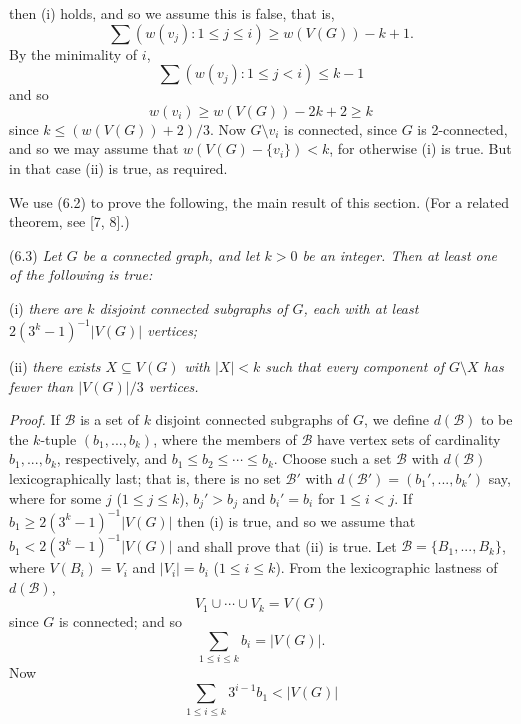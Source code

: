 \noindent then (i) holds, and so we assume this is false, that is,
\begin{equation*}
\sum (w(v_j)\colon 1\le j\le i)\ge w(V(G))-k+1.
\end{equation*}
By the minimality of $i$,
\begin{equation*}
\sum (w(v_j)\colon 1\le j < i)\le k-1
\end{equation*}
and so
\begin{equation*}
w(v_i)\ge w(V(G))-2k+2\ge k
\end{equation*}
since $k\le (w(V(G))+2)/3$. Now $G\setminus v_i$ is connected, since $G$ is 2-connected, and so we may assume that $w(V(G)-\{v_i\})<k$, for otherwise (i) is true. But in that case (ii) is true, as required.

We use (6.2) to prove the following, the main result of this section. (For a related theorem, see [7, 8].)

\stmt
(6.3) \textit{Let $G$ be a connected graph, and let $k>0$ be an integer. Then at least one of the following is true:}

\hspace*{12pt}(i) \textit{there are $k$ disjoint connected subgraphs of $G$, each with at least $2(3^k - 1)^{-1}|V(G)|$ vertices;}

\hspace*{12pt}(ii) \textit{there exists $X\subseteq V(G)$ with $|X|<k$ such that every component of $G\setminus X$ has fewer than $|V(G)|/3$ vertices.}

\textit{Proof.} If $\mathcal{B}$ is a set of $k$ disjoint connected subgraphs of $G$, we define $d(\mathcal{B})$ to be the $k$-tuple $(b_1,..., b_k)$, where the members of $\mathcal{B}$ have vertex sets of cardinality $b_1,..., b_k$, respectively, and $b_1\le b_2\le \cdots\le b_k$. Choose such a set $\mathcal{B}$ with $d(\mathcal{B})$ lexicographically last; that is, there is no set $\mathcal{B}'$ with $d(\mathcal{B}')=(b_1',..., b_k')$ say, where for some $j$ ($1\le j\le k$), $b_j'>b_j$ and $b_i'=b_i$ for $1\le i < j$. If $b_1\ge 2(3^k - 1)^{-1}|V(G)|$ then (i) is true, and so we assume that $b_1<2(3^k - 1)^{-1}|V(G)|$ and shall prove that (ii) is true. Let $\mathcal{B}=\{B_1,..., B_k\}$, where $V(B_i)=V_i$ and $|V_i|=b_i$ ($1\le i\le k$). From the lexicographic lastness of $d(\mathcal{B})$,
\begin{equation*}
V_1\cup\cdots\cup V_k = V(G)
\end{equation*}
since $G$ is connected; and so
\begin{equation*}
\sum_{1\le i\le k} b_i = |V(G)|.
\end{equation*}
Now
\begin{equation*}
\sum_{1\le i\le k} 3^{i-1}b_1 < |V(G)|
\end{equation*}
